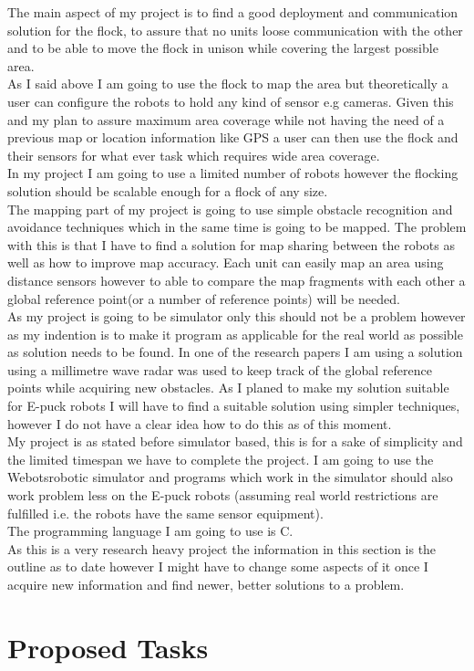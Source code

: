 \documentclass[10pt,a4paper]{article}
\begin{document}
\begin{flushleft}
The main aspect of my project is to find a good deployment and communication solution for the flock, to assure that no units loose communication with the other and to be able to move the flock in unison while covering the largest possible area. \\
As I said above I am going to use the flock to map the area but theoretically a user can configure the robots to hold any kind of sensor e.g cameras. Given this and my plan to assure maximum area coverage while not having the need of a previous map or location information like GPS a user can then use the flock and their sensors for what ever task which requires wide area coverage.  \\
In my project I am going to use a limited number of robots however the flocking solution should be scalable enough for a flock of any size.\\[3ex]

The  mapping part of my project is going to use simple obstacle recognition and avoidance techniques which in the same time is going to be mapped. The problem with this is that I have to find a solution for map sharing between the robots as well as how to improve map accuracy. Each unit can easily map an area using distance sensors however to able to compare the map fragments with each other a global reference point(or a number of reference points) will be needed. \\
As my project is going to be simulator only this should not be a problem however as my indention is to make it program as applicable for the real world as possible as solution needs to be found. In one of the research papers I am using a solution using a millimetre wave radar was used to keep track of the global reference points while acquiring new obstacles\cite{citeulike:8530320}. As I planed to make my solution suitable for E-puck robots I will have to find a suitable solution using simpler techniques, however I do not have a clear idea how to do this as of this moment.\\[3ex]

My project is as stated before simulator based, this is for a sake of simplicity and the limited timespan we have to complete the project.  I am going to use the Webots\texttrademark robotic simulator and programs which work in the simulator should also work problem less on the E-puck robots (assuming real world restrictions are fulfilled i.e. the robots have the same sensor equipment). \\
The programming language I am going to use is C. \\
As this is a very research heavy project the information in this section is the outline as to date however I might have to change some aspects of it once I acquire new information and find newer, better solutions to a problem.
\newpage

\section{Proposed Tasks}

\newpage
\nocite{*}



\end{flushleft}
\end{document}
